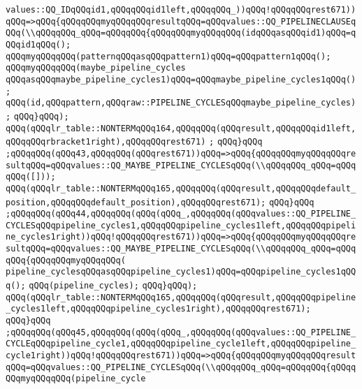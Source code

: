 \verb|values::QQ_IDqQQqid1,qQQqqQQqid1left,qQQqqQQq_))qQQq!qQQqqQQqrest671))qQQq=>qQQq{qQQqqQQqmyqQQqqQQqresultqQQq=qQQqvalues::QQ_PIPELINECLAUSEqQQq(\\qQQqqQQq_qQQq=qQQqqQQq{qQQqqQQqmyqQQqqQQq(idqQQqasqQQqid1)qQQq=qQQqid1qQQq();|\newline
\verb|qQQqmyqQQqqQQq(patternqQQqasqQQqpattern1)qQQq=qQQqpattern1qQQq();|\newline
\verb|qQQqmyqQQqqQQq(maybe_pipeline_cycles|\newline
\verb|qQQqasqQQqmaybe_pipeline_cycles1)qQQq=qQQqmaybe_pipeline_cycles1qQQq();|\newline
\verb|qQQq(id,qQQqpattern,qQQqraw::PIPELINE_CYCLESqQQqmaybe_pipeline_cycles);|\newline
\verb|qQQq}qQQq);|\newline
\verb|qQQq(qQQqlr_table::NONTERMqQQq164,qQQqqQQq(qQQqresult,qQQqqQQqid1left,qQQqqQQqrbracket1right),qQQqqQQqrest671)|\newline
\verb|;|\newline
\verb|qQQq}qQQq|\newline
\verb|;qQQqqQQq(qQQq43,qQQqqQQq(qQQqrest671))qQQq=>qQQq{qQQqqQQqmyqQQqqQQqresultqQQq=qQQqvalues::QQ_MAYBE_PIPELINE_CYCLESqQQq(\\qQQqqQQq_qQQq=qQQqqQQq([]));|\newline
\verb|qQQq(qQQqlr_table::NONTERMqQQq165,qQQqqQQq(qQQqresult,qQQqqQQqdefault_position,qQQqqQQqdefault_position),qQQqqQQqrest671);|\newline
\verb|qQQq}qQQq|\newline
\verb|;qQQqqQQq(qQQq44,qQQqqQQq(qQQq(qQQq_,qQQqqQQq(qQQqvalues::QQ_PIPELINE_CYCLESqQQqpipeline_cycles1,qQQqqQQqpipeline_cycles1left,qQQqqQQqpipeline_cycles1right))qQQq!qQQqqQQqrest671))qQQq=>qQQq{qQQqqQQqmyqQQqqQQqresultqQQq=qQQqvalues::QQ_MAYBE_PIPELINE_CYCLESqQQq(\\qQQqqQQq_qQQq=qQQqqQQq{qQQqqQQqmyqQQqqQQq(|\newline
\verb|pipeline_cyclesqQQqasqQQqpipeline_cycles1)qQQq=qQQqpipeline_cycles1qQQq();|\newline
\verb|qQQq(pipeline_cycles);|\newline
\verb|qQQq}qQQq);|\newline
\verb|qQQq(qQQqlr_table::NONTERMqQQq165,qQQqqQQq(qQQqresult,qQQqqQQqpipeline_cycles1left,qQQqqQQqpipeline_cycles1right),qQQqqQQqrest671);|\newline
\verb|qQQq}qQQq|\newline
\verb|;qQQqqQQq(qQQq45,qQQqqQQq(qQQq(qQQq_,qQQqqQQq(qQQqvalues::QQ_PIPELINE_CYCLEqQQqpipeline_cycle1,qQQqqQQqpipeline_cycle1left,qQQqqQQqpipeline_cycle1right))qQQq!qQQqqQQqrest671))qQQq=>qQQq{qQQqqQQqmyqQQqqQQqresultqQQq=qQQqvalues::QQ_PIPELINE_CYCLESqQQq(\\qQQqqQQq_qQQq=qQQqqQQq{qQQqqQQqmyqQQqqQQq(pipeline_cycle|\newline

